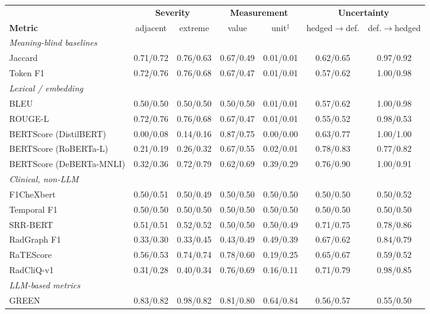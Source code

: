 \begin{tabular}{lcccccc}
\toprule
 & \multicolumn{2}{c}{\textbf{Severity}} & \multicolumn{2}{c}{\textbf{Measurement}} & \multicolumn{2}{c}{\textbf{Uncertainty}} \\
\cmidrule(lr){2-3}\cmidrule(lr){4-5}\cmidrule(lr){6-7}
\textbf{Metric} & adjacent & extreme & value & unit$^{\ddagger}$ & hedged$\to$def. & def.$\to$hedged \\
\midrule
\multicolumn{7}{l}{\textit{Meaning-blind baselines}} \\
Jaccard & 0.71/0.72 & 0.76/0.63 & 0.67/0.49 & 0.01/0.01 & 0.62/0.65 & 0.97/0.92 \\
Token F1 & 0.72/0.76 & 0.76/0.68 & 0.67/0.47 & 0.01/0.01 & 0.57/0.62 & 1.00/0.98 \\
\multicolumn{7}{l}{\textit{Lexical / embedding}} \\
BLEU & 0.50/0.50 & 0.50/0.50 & 0.50/0.50 & 0.01/0.01 & 0.57/0.62 & 1.00/0.98 \\
ROUGE-L & 0.72/0.76 & 0.76/0.68 & 0.67/0.47 & 0.01/0.01 & 0.55/0.52 & 0.98/0.53 \\
BERTScore (DistilBERT) & 0.00/0.08 & 0.14/0.16 & 0.87/0.75 & 0.00/0.00 & 0.63/0.77 & 1.00/1.00 \\
BERTScore (RoBERTa-L) & 0.21/0.19 & 0.26/0.32 & 0.67/0.55 & 0.02/0.01 & 0.78/0.83 & 0.77/0.82 \\
BERTScore (DeBERTa-MNLI) & 0.32/0.36 & 0.72/0.79 & 0.62/0.69 & 0.39/0.29 & 0.76/0.90 & 1.00/0.91 \\
\multicolumn{7}{l}{\textit{Clinical, non-LLM}} \\
F1CheXbert & 0.50/0.51 & 0.50/0.49 & 0.50/0.50 & 0.50/0.50 & 0.50/0.50 & 0.50/0.52 \\
Temporal F1 & 0.50/0.50 & 0.50/0.50 & 0.50/0.50 & 0.50/0.50 & 0.50/0.50 & 0.50/0.50 \\
SRR-BERT & 0.51/0.51 & 0.52/0.52 & 0.50/0.50 & 0.50/0.49 & 0.71/0.75 & 0.78/0.86 \\
RadGraph F1 & 0.33/0.30 & 0.33/0.45 & 0.43/0.49 & 0.49/0.39 & 0.67/0.62 & 0.84/0.79 \\
RaTEScore & 0.56/0.53 & 0.74/0.74 & 0.78/0.60 & 0.19/0.25 & 0.65/0.67 & 0.59/0.52 \\
RadCliQ-v1 & 0.31/0.28 & 0.40/0.34 & 0.76/0.69 & 0.16/0.11 & 0.71/0.79 & 0.98/0.85 \\
\multicolumn{7}{l}{\textit{LLM-based metrics}} \\
GREEN & 0.83/0.82 & 0.98/0.82 & 0.81/0.80 & 0.64/0.84 & 0.56/0.57 & 0.55/0.50 \\

\end{tabular}
